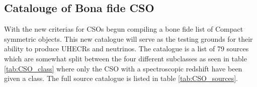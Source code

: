 \subsection{Catalouge of Bona fide CSO}
With the new criterias for CSOs \cite{kiehlmann2023compact} begun compiling a bone fide list of Compact symmetric objects. This new catalogue will serve as the testing grounds for their ability to produce UHECRs and neutrinos. The catalogue is a list of 79 sources which are somewhat split between the four different subclasses as seen in table \ref{tab:CSO_class} where only the CSO with a spectroscopic redshift have been given a class. The full source catalogue is listed in table \ref{tab:CSO_sources}.
